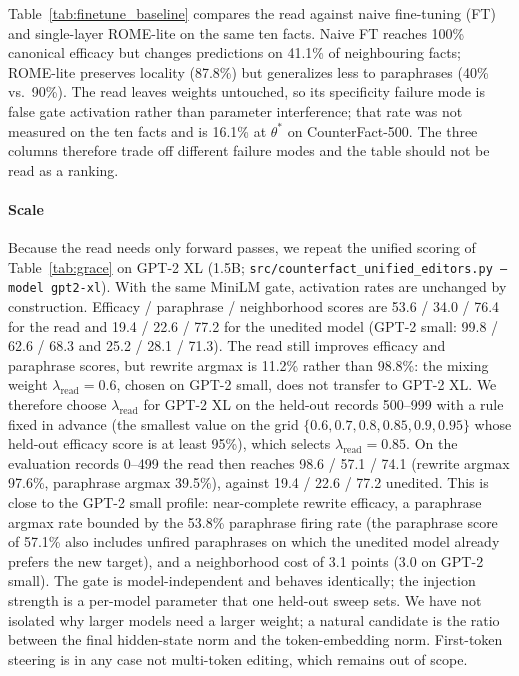 \documentclass[preprint,12pt]{elsarticle}
\newif\ifmarkchanges
\newcommand{\rev}[1]{#1}
\newcommand{\revii}[1]{\ifmarkchanges{\color{blue}#1}\else#1\fi}
\begin{document}
Table~\ref{tab:finetune_baseline} compares the read against naive fine-tuning (FT) and single-layer ROME-lite on the same ten facts. Naive FT reaches 100\% canonical efficacy but changes predictions on 41.1\% of neighbouring facts; ROME-lite preserves locality (87.8\%) but generalizes less to paraphrases (40\% vs.\ 90\%). The read leaves weights untouched, so its specificity failure mode is false gate activation rather than parameter interference; that rate was not measured on the ten facts and is 16.1\% at $\theta^*$ on CounterFact-500. The three columns therefore trade off different failure modes and the table should not be read as a ranking.

\paragraph{Scale}
\rev{Because the read needs only forward passes, we repeat the unified scoring of Table~\ref{tab:grace} on GPT-2 XL (1.5B; \texttt{src/counterfact\_unified\_editors.py --model gpt2-xl}). With the same MiniLM gate, activation rates are unchanged by construction. Efficacy / paraphrase / neighborhood scores are 53.6 / 34.0 / 76.4 for the read and 19.4 / 22.6 / 77.2 for the unedited model (GPT-2 small: 99.8 / 62.6 / 68.3 and 25.2 / 28.1 / 71.3). The read still improves efficacy and paraphrase scores, but rewrite argmax is 11.2\% rather than 98.8\%: the mixing weight $\lambda_{\mathrm{read}}=0.6$, chosen on GPT-2 small, does not transfer to GPT-2 XL. We therefore choose $\lambda_{\mathrm{read}}$ for GPT-2 XL on the held-out records 500--999 with a rule fixed in advance (the smallest value on the grid $\{0.6,0.7,0.8,0.85,0.9,0.95\}$ whose held-out efficacy score is at least 95\%), which selects $\lambda_{\mathrm{read}}=0.85$. On the evaluation records 0--499 the read then reaches 98.6 / 57.1 / 74.1 (rewrite argmax 97.6\%, paraphrase argmax 39.5\%), against 19.4 / 22.6 / 77.2 unedited. This is close to the GPT-2 small profile: near-complete rewrite efficacy, \revii{a paraphrase argmax rate bounded by the 53.8\% paraphrase firing rate (the paraphrase score of 57.1\% also includes unfired paraphrases on which the unedited model already prefers the new target)}, and a neighborhood cost of 3.1 points (3.0 on GPT-2 small). The gate is model-independent and behaves identically; the injection strength is a per-model parameter that one held-out sweep sets. We have not isolated why larger models need a larger weight; a natural candidate is the ratio between the final hidden-state norm and the token-embedding norm. First-token steering is in any case not multi-token editing, which remains out of scope.}
\end{document}
